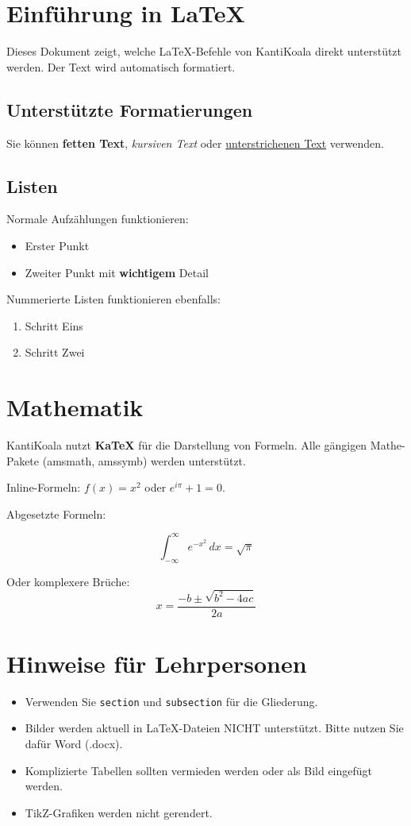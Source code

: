 \documentclass{article}
\begin{document}
\section{Einführung in LaTeX}

Dieses Dokument zeigt, welche LaTeX-Befehle von KantiKoala direkt unterstützt werden.
Der Text wird automatisch formatiert.

\subsection{Unterstützte Formatierungen}

Sie können \textbf{fetten Text}, \textit{kursiven Text} oder \underline{unterstrichenen Text} verwenden.

\subsection{Listen}

Normale Aufzählungen funktionieren:

\begin{itemize}
    \item Erster Punkt
    \item Zweiter Punkt mit \textbf{wichtigem} Detail
\end{itemize}

Nummerierte Listen funktionieren ebenfalls:

\begin{enumerate}
    \item Schritt Eins
    \item Schritt Zwei
\end{enumerate}

\section{Mathematik}

KantiKoala nutzt \textbf{KaTeX} für die Darstellung von Formeln. Alle gängigen Mathe-Pakete (amsmath, amssymb) werden unterstützt.

Inline-Formeln: $f(x) = x^2$ oder $e^{i\pi} + 1 = 0$.

Abgesetzte Formeln:

$$ \int_{-\infty}^{\infty} e^{-x^2} \, dx = \sqrt{\pi} $$

Oder komplexere Brüche:
$$ x = \frac{-b \pm \sqrt{b^2 - 4ac}}{2a} $$

\section{Hinweise für Lehrpersonen}

\begin{itemize}
    \item Verwenden Sie \texttt{section} und \texttt{subsection} für die Gliederung.
    \item Bilder werden aktuell in LaTeX-Dateien NICHT unterstützt. Bitte nutzen Sie dafür Word (.docx).
    \item Komplizierte Tabellen sollten vermieden werden oder als Bild eingefügt werden.
    \item TikZ-Grafiken werden nicht gerendert.
\end{itemize}
\end{document}
